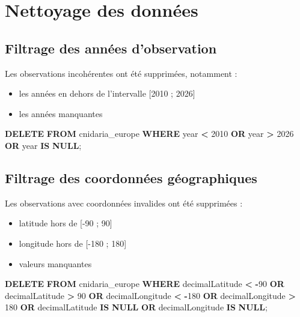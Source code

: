 \documentclass[mstat,12pt]{unswthesis}
\newenvironment{Shaded}{\begin{snugshade}}{\end{snugshade}}
\newcommand{\DecValTok}[1]{\textcolor[rgb]{0.00,0.00,0.81}{#1}}
\newcommand{\KeywordTok}[1]{\textcolor[rgb]{0.13,0.29,0.53}{\textbf{#1}}}
\newcommand{\NormalTok}[1]{#1}
\newcommand{\OperatorTok}[1]{\textcolor[rgb]{0.81,0.36,0.00}{\textbf{#1}}}
\begin{document}
\section{Nettoyage des données}\label{annexe-nettoyage-donnees}

\subsection{Filtrage des années
d'observation}\label{filtrage-des-annuxe9es-dobservation}

Les observations incohérentes ont été supprimées, notamment :

\begin{itemize}
\tightlist
\item
  les années en dehors de l'intervalle {[}2010 ; 2026{]}
\item
  les années manquantes
\end{itemize}

\begin{Shaded}
\begin{Highlighting}[]
\KeywordTok{DELETE} \KeywordTok{FROM}\NormalTok{ cnidaria\_europe}
\KeywordTok{WHERE}\NormalTok{ \textasciigrave{}year\textasciigrave{} }\OperatorTok{\textless{}} \DecValTok{2010} \KeywordTok{OR}\NormalTok{ \textasciigrave{}year\textasciigrave{} }\OperatorTok{\textgreater{}} \DecValTok{2026} \KeywordTok{OR}\NormalTok{ \textasciigrave{}year\textasciigrave{} }\KeywordTok{IS} \KeywordTok{NULL}\NormalTok{;}
\end{Highlighting}
\end{Shaded}

\subsection{Filtrage des coordonnées
géographiques}\label{filtrage-des-coordonnuxe9es-guxe9ographiques}

Les observations avec coordonnées invalides ont été supprimées :

\begin{itemize}
\tightlist
\item
  latitude hors de {[}-90 ; 90{]}
\item
  longitude hors de {[}-180 ; 180{]}
\item
  valeurs manquantes
\end{itemize}

\begin{Shaded}
\begin{Highlighting}[]
\KeywordTok{DELETE} \KeywordTok{FROM}\NormalTok{ cnidaria\_europe}
\KeywordTok{WHERE}\NormalTok{ decimalLatitude }\OperatorTok{\textless{}} \OperatorTok{{-}}\DecValTok{90} 
   \KeywordTok{OR}\NormalTok{ decimalLatitude }\OperatorTok{\textgreater{}} \DecValTok{90}
   \KeywordTok{OR}\NormalTok{ decimalLongitude }\OperatorTok{\textless{}} \OperatorTok{{-}}\DecValTok{180} 
   \KeywordTok{OR}\NormalTok{ decimalLongitude }\OperatorTok{\textgreater{}} \DecValTok{180}
   \KeywordTok{OR}\NormalTok{ decimalLatitude }\KeywordTok{IS} \KeywordTok{NULL}
   \KeywordTok{OR}\NormalTok{ decimalLongitude }\KeywordTok{IS} \KeywordTok{NULL}\NormalTok{;}
\end{Highlighting}
\end{Shaded}
\end{document}

